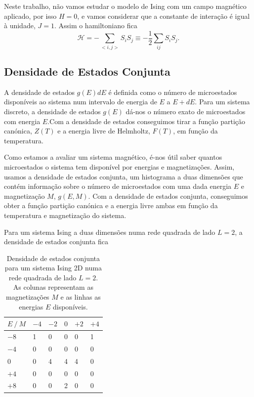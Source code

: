 \documentclass[12pt, a4paper]{article}
\begin{document}
	Neste trabalho, não vamos estudar o modelo de Ising com um campo magnético aplicado, por isso $H=0$, e vamos considerar que a constante de interação é igual à unidade, $J=1$. Assim o hamiltoniano fica
\begin{equation}
	\mathcal{H} = -\sum_{<i,j>} S_i S_j \equiv -\frac{1}{2} \sum_{ij} S_i S_j.
\end{equation}

	\pagebreak

	\subsection{Densidade de Estados Conjunta}

	A densidade de estados $g(E)dE$ é definida como o número de microestados disponíveis ao sistema num intervalo de energia de $E$ a $E + dE$. Para um sistema discreto, a densidade de estados $g(E)$ dá-nos o número exato de microestados com energia $E$.Com a densidade de estados conseguimos tirar a função partição canónica, $Z(T)$ e a energia livre de Helmholtz, $F(T)$, em função da temperatura.
	
	Como estamos a avaliar um sistema magnético, é-nos útil saber quantos microestados o sistema tem disponível por energias e magnetizações. Assim, usamos a densidade de estados conjunta, um histograma a duas dimensões que contém informação sobre o número de microestados com uma dada energia $E$ e magnetização $M$, $g(E, M)$. Com a densidade de estados conjunta, conseguimos obter a função partição canónica e a energia livre ambas em função da temperatura e magnetização do sistema.
	
	Para um sistema Ising a duas dimensões numa rede quadrada de lado $L=2$, a densidade de estados conjunta fica
	\begin{table}[h]
	\centering
	\caption{Densidade de estados conjunta para um sistema Ising 2D numa rede quadrada de lado $L=2$. As colunas representam as magnetizações $M$ e as linhas as energias $E$ disponíveis.}
	\label{exact_L2}
	\begin{tabular}{l|lllll}
	$E \ / \ M$ & $-4$ & $-2$ &  $0$ & $+2$ &  $+4$ \\ \hline
	$-8$  & 1  & 0  & 0 & 0 & 1 \\
	$-4$  & 0  & 0  & 0 & 0 & 0 \\
	$0$   & 0  & 4  & 4 & 4 & 0 \\
	$+4$   & 0  & 0  & 0 & 0 & 0 \\
	$+8$   & 0  & 0  & 2 & 0 & 0
	\end{tabular}
	\end{table}
	
\end{document}
